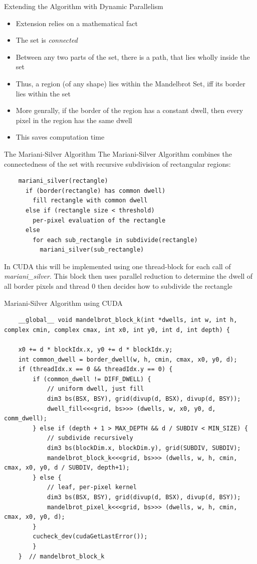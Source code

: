 \documentclass[fleqn,11pt,aspectratio=43]{beamer}
\begin{document}
\begin{frame}{Extending the Algorithm with Dynamic Parallelism}
	\begin{itemize}
		\item Extension relies on a mathematical fact
		\item The set is \textit{connected}
		\item Between any two parts of the set, there is a path, that lies wholly inside the set
		\item Thus, a region (of any shape) lies within the Mandelbrot Set, iff its border lies within the set
		\item More genrally, if the border of the region has a constant dwell, then every pixel in the region has the same dwell
		\item This saves computation time
	\end{itemize}
\end{frame}

\begin{frame}[fragile]{The Mariani-Silver Algorithm}
	The Mariani-Silver Algorithm combines the connectedness of the set with recursive subdivision of rectangular regions:
	\begin{verbatim}
	mariani_silver(rectangle) 
	  if (border(rectangle) has common dwell) 
	    fill rectangle with common dwell
	  else if (rectangle size < threshold)
	    per-pixel evaluation of the rectangle
	  else
	    for each sub_rectangle in subdivide(rectangle)
	      mariani_silver(sub_rectangle)
	\end{verbatim}
	In CUDA this will be implemented using one thread-block for each call of \textit{mariani\_silver}. This block then uses parallel reduction to determine the dwell of all border pixels and thread 0 then decides how to subdivide the rectangle
\end{frame}

\begin{frame}[fragile]{Mariani-Silver Algorithm using CUDA}
	\begin{verbatim}
	__global__ void mandelbrot_block_k(int *dwells, int w, int h, complex cmin, complex cmax, int x0, int y0, int d, int depth) {
	
	x0 += d * blockIdx.x, y0 += d * blockIdx.y;
	int common_dwell = border_dwell(w, h, cmin, cmax, x0, y0, d);
	if (threadIdx.x == 0 && threadIdx.y == 0) {
		if (common_dwell != DIFF_DWELL) {
			// uniform dwell, just fill
			dim3 bs(BSX, BSY), grid(divup(d, BSX), divup(d, BSY)); 
			dwell_fill<<<grid, bs>>> (dwells, w, x0, y0, d, comm_dwell);
		} else if (depth + 1 > MAX_DEPTH && d / SUBDIV < MIN_SIZE) {
			// subdivide recursively
			dim3 bs(blockDim.x, blockDim.y), grid(SUBDIV, SUBDIV); 
			mandelbrot_block_k<<<grid, bs>>> (dwells, w, h, cmin, cmax, x0, y0, d / SUBDIV, depth+1);
		} else {
			// leaf, per-pixel kernel
			dim3 bs(BSX, BSY), grid(divup(d, BSX), divup(d, BSY)); 
			mandelbrot_pixel_k<<<grid, bs>>> (dwells, w, h, cmin, cmax, x0, y0, d);
		}
		cucheck_dev(cudaGetLastError());
		}
	}  // mandelbrot_block_k
	
	\end{verbatim}
\end{frame}
\end{document}
